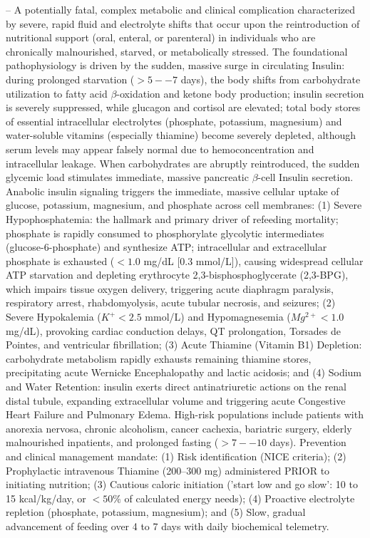 -- A potentially fatal, complex metabolic and clinical complication characterized by severe, rapid fluid and electrolyte shifts that occur upon the reintroduction of nutritional support (oral, enteral, or parenteral) in individuals who are chronically malnourished, starved, or metabolically stressed. The foundational pathophysiology is driven by the sudden, massive surge in circulating Insulin: during prolonged starvation ($>5--7$ days), the body shifts from carbohydrate utilization to fatty acid $\beta$-oxidation and ketone body production; insulin secretion is severely suppressed, while glucagon and cortisol are elevated; total body stores of essential intracellular electrolytes (phosphate, potassium, magnesium) and water-soluble vitamins (especially thiamine) become severely depleted, although serum levels may appear falsely normal due to hemoconcentration and intracellular leakage. When carbohydrates are abruptly reintroduced, the sudden glycemic load stimulates immediate, massive pancreatic $\beta$-cell Insulin secretion. Anabolic insulin signaling triggers the immediate, massive cellular uptake of glucose, potassium, magnesium, and phosphate across cell membranes: (1) Severe Hypophosphatemia: the hallmark and primary driver of refeeding mortality; phosphate is rapidly consumed to phosphorylate glycolytic intermediates (glucose-6-phosphate) and synthesize ATP; intracellular and extracellular phosphate is exhausted ($<1.0$ mg/dL [0.3 mmol/L]), causing widespread cellular ATP starvation and depleting erythrocyte 2,3-bisphosphoglycerate (2,3-BPG), which impairs tissue oxygen delivery, triggering acute diaphragm paralysis, respiratory arrest, rhabdomyolysis, acute tubular necrosis, and seizures; (2) Severe Hypokalemia ($K^+ < 2.5$ mmol/L) and Hypomagnesemia ($Mg^{2+} < 1.0$ mg/dL), provoking cardiac conduction delays, QT prolongation, Torsades de Pointes, and ventricular fibrillation; (3) Acute Thiamine (Vitamin B1) Depletion: carbohydrate metabolism rapidly exhausts remaining thiamine stores, precipitating acute Wernicke Encephalopathy and lactic acidosis; and (4) Sodium and Water Retention: insulin exerts direct antinatriuretic actions on the renal distal tubule, expanding extracellular volume and triggering acute Congestive Heart Failure and Pulmonary Edema. High-risk populations include patients with anorexia nervosa, chronic alcoholism, cancer cachexia, bariatric surgery, elderly malnourished inpatients, and prolonged fasting ($>7--10$ days). Prevention and clinical management mandate: (1) Risk identification (NICE criteria); (2) Prophylactic intravenous Thiamine (200--300 mg) administered PRIOR to initiating nutrition; (3) Cautious caloric initiation ('start low and go slow': 10 to 15 kcal/kg/day, or $<50\%$ of calculated energy needs); (4) Proactive electrolyte repletion (phosphate, potassium, magnesium); and (5) Slow, gradual advancement of feeding over 4 to 7 days with daily biochemical telemetry.


